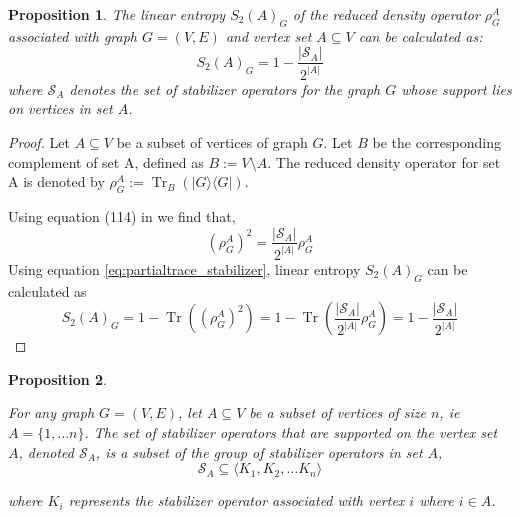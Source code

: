 \documentclass{article}
\newtheorem{prop}{Proposition}
\DeclareMathOperator{\Tr}{Tr}
\newcommand{\ket}[1]{|#1\rangle}
\newcommand{\bra}[1]{\langle #1|}
\begin{document}
\begin{prop} \label{prop:calculating_linear_entropy_using_stablizer_support}
    The linear entropy  $S_2(A)_G $ of the reduced density operator $\rho^A_G$ associated with graph $ G = (V, E) $ and vertex set $ A \subseteq V$ can be calculated as:
    \begin{equation} \label{eq:calculating_linear_entropy_using_stablizer_support}
     S_2(A)_G = 1 - \frac{|\mathcal{S}_A|}{2^{|A|}}
    \end{equation}
    where $\mathcal{S}_A$ denotes the set of stabilizer operators for the graph 
$G$ whose support lies on vertices in set $A$.

    
\end{prop}
\begin{proof}
     Let $A \subseteq V$ be a subset of vertices of graph $G$. Let $B$ be the corresponding complement of set A, defined as $B := V\setminus A$. The reduced density operator for set A is denoted by $\rho^A_G := \Tr_B(\ket{G}\bra{G})$. 
     
    Using equation (114) in \cite{hein2006entanglement} we find that,
    \begin{equation}
    \label{eq:partialtrace_stabilizer}
        (\rho^A_G)^2 = \frac{|\mathcal{S}_A|}{2^{|A|}} \rho^A_G
    \end{equation}
    Using equation \eqref{eq:partialtrace_stabilizer}, linear entropy $S_2(A)_{G}$ can be calculated as
    \begin{equation}
        S_2(A)_{G} = 1 - \Tr{((\rho^A_G)^2)} = 1 -  \Tr\left( \frac{|\mathcal{S}_A|}{2^{|A|}} \rho^A_G \right) =1 - \frac{|\mathcal{S}_A|}{2^{|A|}}
    \end{equation}
\end{proof}
\begin{prop}
\label{prop:support_stabilizer_subset_of_group_of_stablizer_operator}

For any graph $ G = (V, E) $, let $ A \subseteq V $ be a subset of vertices of size $n$, ie $A = \{1, \dots n\}$. The set of stabilizer operators that are supported on the vertex set $ A $, denoted $ \mathcal{S}_A $, is a subset of the  group of stabilizer operators in set $A$, 
\begin{equation}
\label{eq:support_stabilizer_subset_of_group_of_stablizer_operator}
\mathcal{S}_A \subseteq \langle K_1, K_2, \dots K_n \rangle
\end{equation}

where $K_i$  represents the stabilizer operator associated with vertex $i$ where $i \in A $.

\end{prop}
\end{document}
